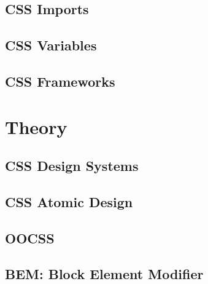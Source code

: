 \documentclass[b5paper,openany]{book}
\begin{document}
\section{CSS Imports}


\section{CSS Variables}


\section{CSS Frameworks}


%


\chapter{Theory}

\section{CSS Design Systems}


\section{CSS Atomic Design}


\section{OOCSS}


\section{BEM: Block Element Modifier}






\end{document}

